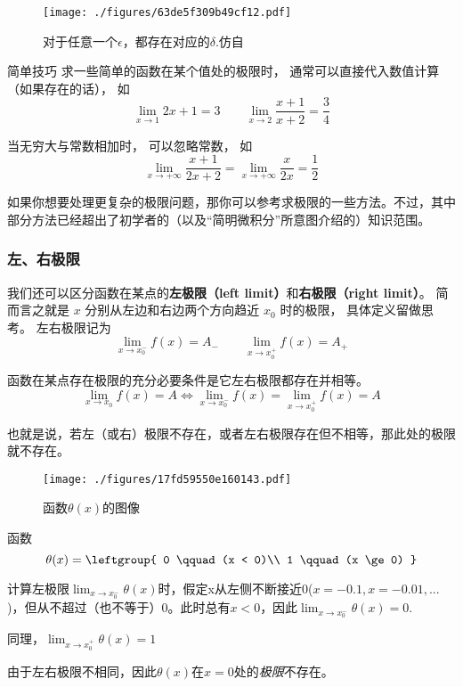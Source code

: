 \begin{figure}[ht]
\centering
\texttt{[image: ./figures/63de5f309b49cf12.pdf]}
\caption{对于任意一个$\epsilon$，都存在对应的$\delta$.仿自\cite{Thomas}} \label{fig_FunLim_8}
\end{figure}

\begin{example}{简单技巧}
求一些简单的函数在某个值处的极限时， 通常可以直接代入数值计算（如果存在的话）， 如
\begin{equation}
\lim_{x\to 1} 2x + 1 = 3 \qquad \lim_{x\to 2}\frac{x + 1}{x + 2} = \frac34
\end{equation}

当无穷大与常数相加时， 可以忽略常数， 如
\begin{equation}
\lim_{x\to +\infty} \frac{x + 1}{2x + 2} = \lim_{x\to +\infty} \frac{x}{2x} = \frac12
\end{equation}

如果你想要处理更复杂的极限问题，那你可以参考求极限的一些方法。不过，其中部分方法已经超出了初学者的（以及“简明微积分”所意图介绍的）知识范围。
\end{example}

\subsubsection{左、右极限}
我们还可以区分函数在某点的\textbf{左极限（left limit）}和\textbf{右极限（right limit）}。 简而言之就是 $x$ 分别从左边和右边两个方向趋近 $x_0$ 时的极限， 具体定义留做思考。 左右极限记为
\begin{equation}
\lim_{x\to x_0^-} f(x) = A_- \qquad \lim_{x\to x_0^+} f(x) = A_+
\end{equation}

\begin{theorem}{}
函数在某点存在极限的充分必要条件是它左右极限都存在并相等。
$$\lim_{x\to x_0} f(x) = A \Leftrightarrow \lim_{x\to x_0^-} f(x) = \lim_{x\to x_0^+} f(x) = A $$

也就是说，若左（或右）极限不存在，或者左右极限存在但不相等，那此处的极限就不存在。
\end{theorem}

\begin{example}{}
\begin{figure}[ht]
\centering
\texttt{[image: ./figures/17fd59550e160143.pdf]}
\caption{函数$\theta(x)$的图像} \label{fig_FunLim_3}
\end{figure}
函数
\begin{equation}
\theta(x) = \leftgroup{
0 \qquad (x < 0)\\
1 \qquad (x \ge 0)
}\end{equation}

计算左极限$\lim_{x\to x_0^-} \theta(x)$时，假定x从左侧不断接近$0$($x=-0.1,x=-0.01,...$)，但从不超过（也不等于）$0$。此时总有$x<0$，因此$\lim_{x\to x_0^-} \theta(x) = 0$. 

同理，$\lim_{x\to x_0^+} \theta(x) = 1$

由于左右极限不相同，因此$\theta(x)$在$x=0$处的\textsl{极限}不存在。
\end{example}

